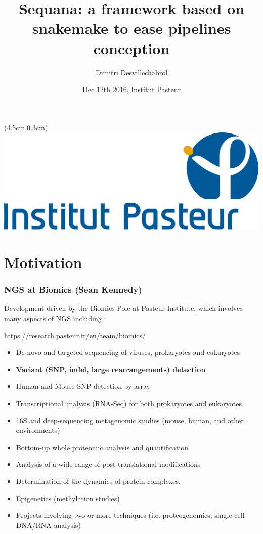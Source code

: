 \documentclass{beamer}
\title{Sequana: a framework based on snakemake to ease pipelines conception}
\author[D.Desvillechabrol]{Dimitri Desvillechabrol}
\institute{Institut Pasteur}
\date{Dec 12th 2016, Institut Pasteur}
\begin{document}

\begin{frame}[plain]
    \titlepage
    \begin{textblock*}{5cm}(4.5cm,0.3cm)
        \includegraphics[scale=0.09]{images/Institut_Pasteur.png}
    \end{textblock*}
\end{frame}


\section{Motivation}

\begin{frame}
    \frametitle{NGS at Biomics (Sean Kennedy)}
 
 Development driven by the Biomics Pole at Pasteur Institute, which involves
 many aspects of NGS including :
 
 \tiny
 \begin{block}{https://research.pasteur.fr/en/team/biomics/}
  \begin{itemize}
  \item De novo and targeted sequencing of viruses, prokaryotes and eukaryotes
  \item \textbf{Variant (SNP, indel, large rearrangements) detection}
  \item Human and Mouse SNP detection by array
  \item Transcriptional analysis (RNA-Seq) for both prokaryotes and eukaryotes
  \item 16S and deep-sequencing metagenomic studies (mouse, human, and other environments)
  \item Bottom-up whole proteomic analysis and quantification
  \item Analysis of a wide range of post-translational modifications
  \item Determination of the dynamics of protein complexes.
  \item Epigenetics (methylation studies)
  \item Projects involving two or more techniques (i.e. proteogenomics, single-cell DNA/RNA analysis)
  \end{itemize}
 \end{block}
 \small 
\end{frame}
\end{document}
